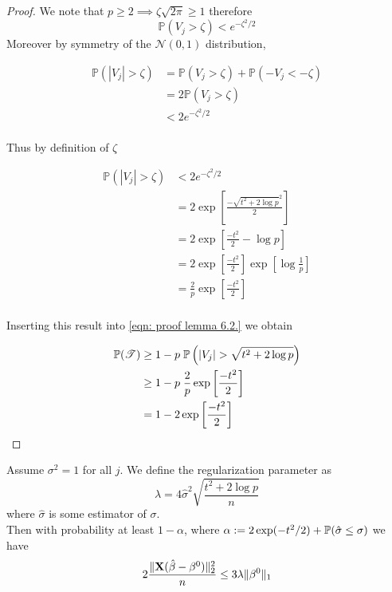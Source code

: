 \begin{proof}
    We note that $p \geq 2 \implies \zeta \sqrt{2 \pi} \geq 1$ therefore
    $$
        \mathbb{P}(V_j > \zeta) <  e^{-\zeta^2/2}
    $$
    Moreover by symmetry of the $\mathscr{N} (0,1)$ distribution,

    \begin{align*}
        \mathbb{P} (|V_j| > \zeta) & = \mathbb{P} (V_j > \zeta) + \mathbb{P} (- V_j < - \zeta) \\
                                   & = 2 \mathbb{P} (V_j > \zeta)                              \\
                                   & < 2 e^{-\zeta^2/2}                                        \\
    \end{align*}

    Thus by definition of $\zeta$

    \begin{align*}
        \mathbb{P} (|V_j| > \zeta) & < 2 e^{-\zeta^2/2}                                                             \\
                                   & = 2 \exp \left[ \frac{- \sqrt{t^{2} + 2 \log p} ^2}{2} \right]                 \\
                                   & = 2 \exp \left[ \frac{- t^{2}}{2} - \log p \right]                             \\
                                   & = 2 \exp \left[ \frac{- t^{2}}{2} \right] \exp \left[ \log \frac{1}{p} \right] \\
                                   & = \frac{2}{p} \exp \left[ \frac{- t^{2}}{2} \right]                            \\
    \end{align*}

    Inserting this result into \eqref{eqn: proof lemma 6.2.} we obtain

    \begin{align*}
        \mathbb{P}(\mathscr{T}) & \geq 1 - p \; \P \left( | V_{j} | > \sqrt{t^{2}+2 \log p}  \right) \\
                                & \geq 1 - p \; \frac{2}{p} \exp \left[ \frac{- t^{2}}{2} \right] \\
                                & = 1 - 2 \exp \left[ \frac{- t^{2}}{2} \right] \\
    \end{align*}
\end{proof}

\begin{corollary}
    Assume $\sigma^2 = 1$ for all $j$. We define the regularization parameter as
    $$\lambda = 4 \hat \sigma^2 \sqrt{\frac{t^2 + 2 \log p}{n}}$$
    where $\hat \sigma$ is some estimator of $\sigma$. \\
    Then with probability at least $1 - \alpha$, where $\alpha := 2 \exp(-t^2/2) + \P (\hat \sigma \leq \sigma)$ we have
    $$2 \frac{\| \X (\hat \beta - \beta^0)\|_2^2}{n} \leq 3 \lambda \| \beta^0 \|_1$$
\end{corollary}

